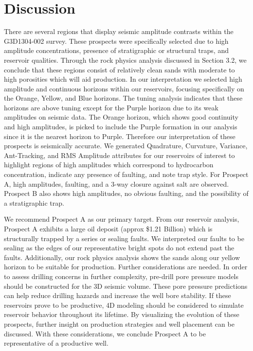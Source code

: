 \documentclass[fleqn]{article}
\begin{document}
\section{Discussion}
There are several regions that display seismic amplitude contrasts within the G3D1304-002 survey. These prospects were specifically selected due to high amplitude concentrations, presence of stratigraphic or structural traps, and reservoir qualities. Through the rock physics analysis discussed in Section 3.2, we conclude that these regions consist of relatively clean sands with moderate to high porosities which will aid production. In our interpretation we selected high amplitude and continuous horizons within our reservoirs, focusing specifically on the Orange, Yellow, and Blue horizons. The tuning analysis indicates that these horizons are above tuning except for the Purple horizon due to its weak amplitudes on seismic data. The Orange horizon, which shows good continuity and high amplitudes, is picked to include the Purple formation in our analysis since it is the nearest horizon to Purple. Therefore our interpretation of these prospects is seismically accurate. We generated Quadrature, Curvature, Variance, Ant-Tracking, and RMS Amplitude attributes for our reservoirs of interest to highlight regions of high amplitudes which correspond to hydrocarbon concentration, indicate any presence of faulting, and note trap style. For Prospect A, high amplitudes, faulting, and a 3-way closure against salt are observed. Prospect B also shows high amplitudes, no obvious faulting, and the possibility of a stratigraphic trap.

We recommend Prospect A as our primary target. From our reservoir analysis, Prospect A exhibits a large oil deposit (approx \$1.21 Billion) which is structurally trapped by a series or sealing faults. We interpreted our faults to be sealing as the edges of our representative bright spots do not extend past the faults. Additionally, our rock physics analysis shows the sands along our yellow horizon to be suitable for production. Further considerations are needed. In order to assess drilling concerns in further complexity, pre-drill pore pressure models should be constructed for the 3D seismic volume. These pore pressure predictions can help reduce drilling hazards and increase the well bore stability. If these reservoirs prove to be productive, 4D modeling should be considered to simulate reservoir behavior throughout its lifetime. By visualizing the evolution of these prospects, further insight on production strategies and well placement can be discussed. With these considerations, we conclude Prospect A to be representative of a productive well. 
\end{document}
